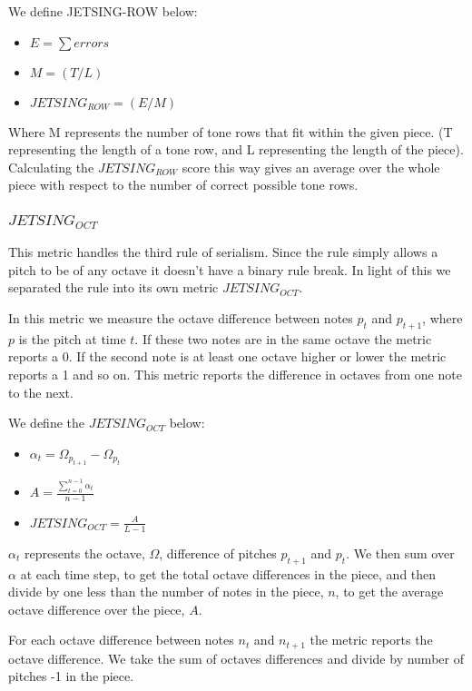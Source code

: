 \documentclass[11pt]{article}
\begin{document}
We define JETSING-ROW below:
\begin{itemize}
    \item $E = \sum errors $
    \item $M = (T / L)$
    \item $JETSING_{ROW} = (E / M)$
\end{itemize}

Where M represents the number of tone rows that fit within the given piece.
(T representing the length of a tone row, and L representing the length of the piece).
Calculating the $JETSING_{ROW}$ score this way gives an average over the whole piece with respect to the number of correct possible tone rows.

\subsubsection{$JETSING_{OCT}$}
This metric handles the third rule of serialism.
Since the rule simply allows a pitch to be of any octave it doesn't have a binary rule break.
In light of this we separated the rule into its own metric $JETSING_{OCT}$.

In this metric we measure the octave difference between notes $p_t$ and $p_{t+1}$, where $p$ is the pitch at time $t$.
If these two notes are in the same octave the metric reports a 0.
If the second note is at least one octave higher or lower the metric reports a 1 and so on.
This metric reports the difference in octaves from one note to the next.

We define the $JETSING_{OCT}$ below:

\begin{itemize}
    \item $\alpha_t = \Omega_{p_{t+1}} - \Omega_{p_t}$
    \item $A = \frac{\sum_{t=0}^{n-1} \alpha_t}{n-1}$
    \item $JETSING_{OCT} = \frac{A}{L-1} $
\end{itemize}

$\alpha_t$ represents the octave, $\Omega$, difference of pitches $p_{t+1}$ and $p_t$.
We then sum over $\alpha$ at each time step, to get the total octave differences in the piece,
and then divide by one less than the number of notes in the piece, $n$, to get the average octave difference over the piece, $A$.

For each octave difference between notes $n_t$ and $n_{t+1}$ the metric reports the octave difference.
We take the sum of octaves differences and divide by number of pitches -1 in the piece.
\end{document}
